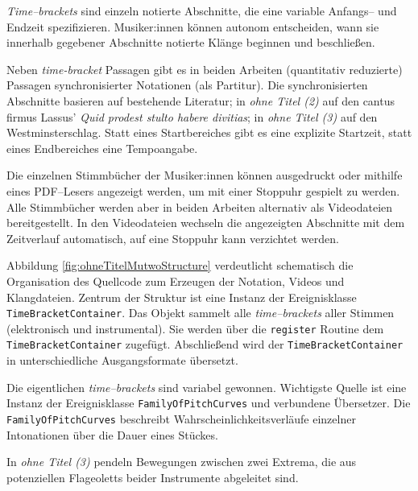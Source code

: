 \documentclass[12pt,a4paper,ngerman]{article}
\begin{document}
\emph{Time--brackets} sind einzeln notierte Abschnitte, die eine variable Anfangs-- und Endzeit spezifizieren.
Musiker:innen können autonom entscheiden, wann sie innerhalb gegebener Abschnitte notierte Klänge beginnen und beschließen.


\bigskip

Neben \emph{time-bracket} Passagen gibt es in beiden Arbeiten (quantitativ reduzierte) Passagen synchronisierter Notationen (als Partitur).
Die synchronisierten Abschnitte basieren auf bestehende Literatur; in \emph{ohne Titel (2)} auf den cantus firmus Lassus' \emph{Quid prodest stulto habere divitias}; in \emph{ohne Titel (3)} auf den Westminsterschlag.
Statt eines Startbereiches gibt es eine explizite Startzeit, statt eines Endbereiches eine Tempoangabe.

\bigskip

Die einzelnen Stimmbücher der Musiker:innen können ausgedruckt oder mithilfe eines PDF--Lesers angezeigt werden, um mit einer Stoppuhr gespielt zu werden.
Alle Stimmbücher werden aber in beiden Arbeiten alternativ als Videodateien bereitgestellt.
In den Videodateien wechseln die angezeigten Abschnitte mit dem Zeitverlauf automatisch, auf eine Stoppuhr kann verzichtet werden.

\bigskip

Abbildung \ref{fig:ohneTitelMutwoStructure} verdeutlicht schematisch die Organisation des Quellcode zum Erzeugen der Notation, Videos und Klangdateien.
Zentrum der Struktur ist eine Instanz der Ereignisklasse \texttt{TimeBracketContainer}.
Das Objekt sammelt alle \emph{time--brackets} aller Stimmen (elektronisch und instrumental).
Sie werden über die \texttt{register} Routine dem \texttt{TimeBracketContainer} zugefügt.
Abschließend wird der \texttt{TimeBracketContainer} in unterschiedliche Ausgangsformate übersetzt.

\bigskip

Die eigentlichen \emph{time--brackets} sind variabel gewonnen.
Wichtigste Quelle ist eine Instanz der Ereignisklasse \texttt{FamilyOfPitchCurves} und verbundene Übersetzer.
Die \texttt{FamilyOfPitchCurves} beschreibt Wahrscheinlichkeitsverläufe einzelner Intonationen über die Dauer eines Stückes.

\smallskip

In \emph{ohne Titel (3)} pendeln Bewegungen zwischen zwei Extrema, die aus potenziellen Flageoletts beider Instrumente abgeleitet sind.
\end{document}
